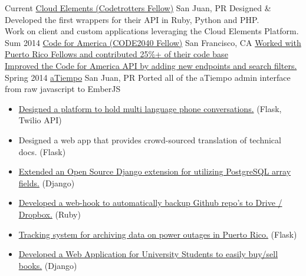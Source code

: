\documentclass[]{friggeri-cv}
\begin{document}
\begin{entrylist}
\entry
{Current}
{\href{http://cloud-elements.com/}{Cloud Elements (Codetrotters Fellow)}}
{San Juan, PR}
{Designed \& Developed the first wrappers for their API in Ruby, Python and PHP. \\
Work on client and custom applications leveraging the Cloud Elements Platform.  }
\entry
{Sum 2014}
{\href{http://codeforamerica.org}{Code for America (CODE2040 Fellow)}}
{San Francisco, CA}
{\href{https://github.com/CoquiCoders/}{Worked with Puerto Rico Fellows and contributed 25\%+ of their code base} \\
\href{https://github.com/codeforamerica/cfapi}{Improved the Code for America API by adding new endpoints and search filters.}}
\entry
{Spring 2014}
{\href{http://atiempo.com/}{aTiempo}}
{San Juan, PR}
{Ported all of the aTiempo admin interface from raw javascript to EmberJS}
\end{entrylist}

\begin{itemize}
\item \href{https://github.com/chrisrodz/talk}{Designed a platform to hold multi language phone conversations.} (Flask, Twilio API)
\item Designed a web app that provides crowd-sourced translation of technical docs. (Flask)
\item \href{https://github.com/chrisrodz/djorm-ext-pgarray}{Extended an Open Source Django extension for utilizing PostgreSQL array fields.} (Django)
\item \href{https://github.com/chrisrodz/gh-backups}{Developed a web-hook to automatically backup Github repo's to Drive / Dropbox.} (Ruby)
\item \href{http://prepa-down.com/}{Tracking system for archiving data on power outages in Puerto Rico.} (Flask)
\item \href{https://github.com/chrisrodz/libros-online}{Developed a Web Application for University Students to easily buy/sell books.} (Django)
\end{itemize}

\end{document}
